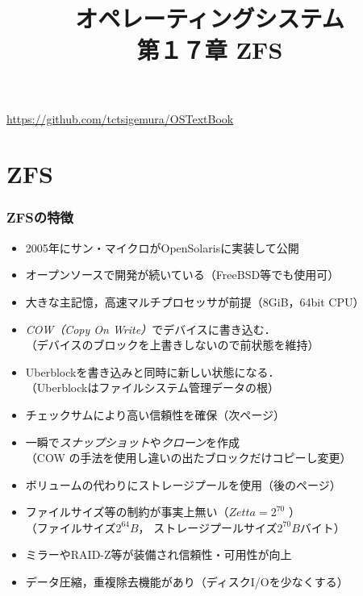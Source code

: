 \documentclass[handout]{beamer}                   %
\begin{document}
\title[ZFS]
      {オペレーティングシステム\\第１７章 ZFS}
\date{}
\begin{frame}
  \titlepage
  \centerline{\url{https://github.com/tctsigemura/OSTextBook}}
\end{frame}


\section{ZFS}
\begin{frame}
  \frametitle{ZFSの特徴}
  \begin{itemize}
  \item 2005年にサン・マイクロがOpenSolarisに実装して公開
  \item オープンソースで開発が続いている（FreeBSD等でも使用可）
  \item 大きな主記憶，高速マルチプロセッサが前提（8GiB，64bit CPU）
  \item \emph{COW（Copy On Write）}でデバイスに書き込む．\\
    （デバイスのブロックを上書きしないので前状態を維持）
  \item Uberblockを書き込みと同時に新しい状態になる．\\
    （Uberblockはファイルシステム管理データの根）
  \item チェックサムにより高い信頼性を確保（次ページ）
  \item 一瞬で\emph{スナップショット}や\emph{クローン}を作成 \\
    （COW の手法を使用し違いの出たブロックだけコピーし変更）
  \item ボリュームの代わりにストレージプールを使用（後のページ）
  \item ファイルサイズ等の制約が事実上無い（$Zetta = 2^{70}$ ）\\
    （ファイルサイズ$2^{64}B$， ストレージプールサイズ$2^{70}B$バイト）
  \item ミラーやRAID-Z等が装備され信頼性・可用性が向上
  \item データ圧縮，重複除去機能があり（ディスクI/Oを少なくする）
  \end{itemize}
  \vfill
\end{frame}
\end{document}
